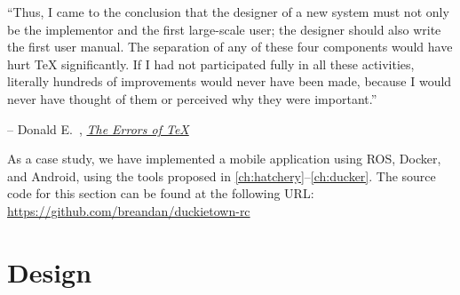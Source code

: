 \documentclass[12pt,initial,twoside,maitrise]{dms}
\numberwithin{equation}{section}
\numberwithin{table}{chapter}
\numberwithin{figure}{chapter}
\begin{document}
\setlength{\epigraphwidth}{0.80\textwidth}
\epigraph{``Thus, I came to the conclusion that the designer of a new system must not only be the implementor and the first large-scale user; the designer should also write the first user manual. The separation of any of these four components would have hurt TeX significantly. If I had not participated fully in all these activities, literally hundreds of improvements would never have been made, because I would never have thought of them or perceived why they were important.''}{\begin{flushright}-- Donald E.~\citet{knutherrors}, \href{https://yurichev.com/mirrors/knuth1989.pdf}{\textit{The Errors of \TeX}}\end{flushright}}

As a case study, we have implemented a mobile application using ROS, Docker, and Android, using the tools proposed in \autoref{ch:hatchery}--\autoref{ch:ducker}. The source code for this section can be found at the following URL: \url{https://github.com/breandan/duckietown-rc}

\section{Design}
\end{document}
